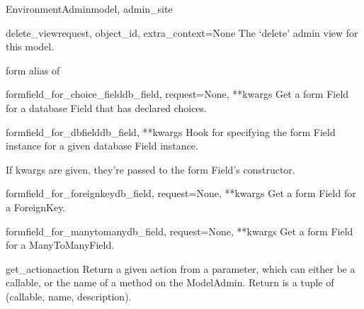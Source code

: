 \documentclass[letterpaper,10pt,english]{sphinxmanual}
\begin{document}
\begin{classdesc}{EnvironmentAdmin}{model, admin\_site}
\hypertarget{data.admin.EnvironmentAdmin.delete_view}{}\begin{methoddesc}{delete\_view}{request, object\_id, extra\_context=None}
The `delete' admin view for this model.
\end{methoddesc}

\hypertarget{data.admin.EnvironmentAdmin.form}{}\begin{memberdesc}{form}
alias of 
\end{memberdesc}

\hypertarget{data.admin.EnvironmentAdmin.formfield_for_choice_field}{}\begin{methoddesc}{formfield\_for\_choice\_field}{db\_field, request=None, **kwargs}
Get a form Field for a database Field that has declared choices.
\end{methoddesc}

\hypertarget{data.admin.EnvironmentAdmin.formfield_for_dbfield}{}\begin{methoddesc}{formfield\_for\_dbfield}{db\_field, **kwargs}
Hook for specifying the form Field instance for a given database Field
instance.

If kwargs are given, they're passed to the form Field's constructor.
\end{methoddesc}

\hypertarget{data.admin.EnvironmentAdmin.formfield_for_foreignkey}{}\begin{methoddesc}{formfield\_for\_foreignkey}{db\_field, request=None, **kwargs}
Get a form Field for a ForeignKey.
\end{methoddesc}

\hypertarget{data.admin.EnvironmentAdmin.formfield_for_manytomany}{}\begin{methoddesc}{formfield\_for\_manytomany}{db\_field, request=None, **kwargs}
Get a form Field for a ManyToManyField.
\end{methoddesc}

\hypertarget{data.admin.EnvironmentAdmin.get_action}{}\begin{methoddesc}{get\_action}{action}
Return a given action from a parameter, which can either be a callable,
or the name of a method on the ModelAdmin.  Return is a tuple of
(callable, name, description).
\end{methoddesc}


\end{classdesc}
\end{document}
